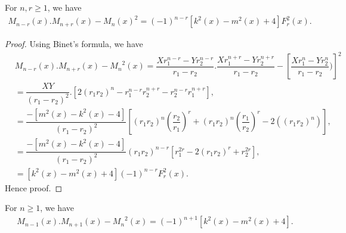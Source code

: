 \begin{theorem} For $n, r\geq{1}$, we have
\begin{align*}
M_{n-r}(x).M_{n+r}(x)-{{M}_{n}(x)}^2={(-1)}^{n-r}{[{k^{2}(x)-m^{2}(x)+4}]F_{r}^2(x)}. 
\end{align*}
\end{theorem}
\begin{proof}
Using Binet's formula, we have
\begin{align*}
&M_{n-r}(x).M_{n+r}(x)-{{M}_{n}}^2(x) = \dfrac{{X}{r}_{1}^{n-r}-{Y}{r_{2}^{n-r}}}{r_{1}-r_{2}}.\dfrac{{X}{r}_{1}^{n+r}-{Y}{r_{2}^{n+r}}}{r_{1}-r_{2}}-[\dfrac{{X}{r}_{1}^{n}-{Y}{r_{2}^{n}}}{r_{1}-r_{2}})]^2\\
& = \dfrac{XY}{(r_{1}-r_{2})^2}.[2({r_{1}r_{2}})^n-r_{1}^{n-r}r_{2}^{n+r}-r_{2}^{n-r}r_{1}^{n+r}],\\
& = \dfrac{-[m^{2}(x)-k^{2}(x)-4]}{(r_{1}-r_{2})^2}[(r_{1}r_{2})^n(\dfrac{r_{2}}{r_{1}})^r+(r_{1}r_{2})^n(\dfrac{r_{1}}{r_{2}})^r-2((r_{1}r_{2})^n)],\\
& = \dfrac{-[m^{2}(x)-k^{2}(x)-4]}{(r_{1}-r_{2})^2}(r_{1}r_{2})^{n-r}[r_{1}^{2r}-2{(r_{1}r_{2})}^r+r_{2}^{2r}],\\
&= {[k^2(x)-m^2(x)+4]}{(-1)}^{n-r}F_{r}^2(x).
\end{align*}
Hence proof.
\end{proof}
\begin{theorem} For $n\geq{1}$, we have
\begin{align*}
M_{n-1}(x).M_{n+1}(x)-{{M}_{n}}^2(x)={(-1)}^{n+1}{[{k^{2}(x)-m^{2}(x)+4}]}.
\end{align*}
\end{theorem}
